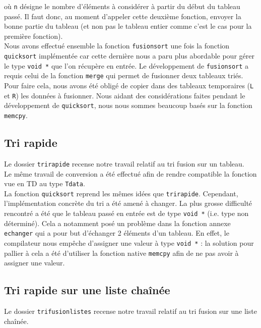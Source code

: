 \documentclass[11pt]{article}
\begin{document}
où \texttt{n} désigne le nombre d'éléments à considérer à partir du début du tableau passé. Il faut donc, au moment d'appeler cette deuxième fonction, envoyer la bonne partie du tableau (et non pas le tableau entier comme c'est le cas pour la première fonction). \\

Nous avons effectué ensemble la fonction \texttt{fusionsort} une fois la fonction \texttt{quicksort} implémentée car cette dernière nous a paru plus abordable pour gérer le type \texttt{void *} que l'on récupère en entrée.
Le développement de \texttt{fusionsort} a requis celui de la fonction \texttt{merge} qui permet de fusionner deux tableaux triés. Pour faire cela, nous avons été obligé de copier dans des tableaux temporaires (\texttt{L} et \texttt{R}) les données à fusionner. Nous aidant des considérations faites pendant le développement de \texttt{quicksort}, nous nous sommes beaucoup basés sur la fonction \texttt{memcpy}.

\subsection{Tri rapide}

\quad \quad Le dossier \texttt{tri\textunderscore rapide} recense notre travail relatif au tri fusion sur un tableau. \\

Le même travail de conversion a été effectué afin de rendre compatible la fonction vue en TD au type \texttt{T\textunderscore data}. \\

La fonction \texttt{quicksort} reprend les mêmes idées que \texttt{tri\textunderscore rapide}. Cependant, l'implémentation concrète du tri a été amené à changer. La plus grosse difficulté rencontré a été que le tableau passé en entrée est de type \texttt{void *} (i.e. type non déterminé).
Cela a notamment posé un problème dans la fonction annexe \texttt{echanger} qui a pour but d'échanger 2 éléments d'un tableau. En effet, le compilateur nous empêche d'assigner une valeur à type \texttt{void *} : la solution pour pallier à cela a été d'utiliser la fonction native \texttt{memcpy} afin de ne pas avoir à assigner une valeur. 

\subsection{Tri rapide sur une liste chaînée}

\quad \quad Le dossier \texttt{tri\textunderscore fusion\textunderscore listes} recense notre travail relatif au tri fusion sur une liste chaînée.
\end{document}
